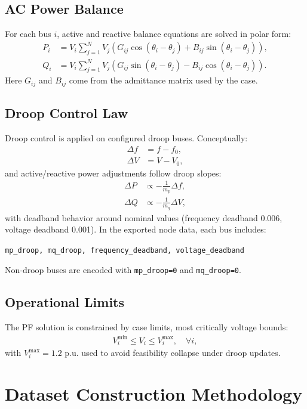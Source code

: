 ﻿\documentclass[11pt]{article}
\begin{document}
\subsection{AC Power Balance}
For each bus $i$, active and reactive balance equations are solved in polar form:
\begin{align}
P_i &= V_i \sum_{j=1}^{N} V_j \left(G_{ij}\cos(\theta_i-\theta_j) + B_{ij}\sin(\theta_i-\theta_j)\right), \\
Q_i &= V_i \sum_{j=1}^{N} V_j \left(G_{ij}\sin(\theta_i-\theta_j) - B_{ij}\cos(\theta_i-\theta_j)\right).
\end{align}
Here $G_{ij}$ and $B_{ij}$ come from the admittance matrix used by the case.

\subsection{Droop Control Law}
Droop control is applied on configured droop buses. Conceptually:
\begin{align}
\Delta f &= f - f_0, \\
\Delta V &= V - V_0,
\end{align}
and active/reactive power adjustments follow droop slopes:
\begin{align}
\Delta P &\propto -\frac{1}{m_p} \Delta f, \\
\Delta Q &\propto -\frac{1}{m_q} \Delta V,
\end{align}
with deadband behavior around nominal values (frequency deadband 0.006, voltage deadband 0.001). In the exported node data, each bus includes:
\begin{center}
\texttt{mp\_droop, mq\_droop, frequency\_deadband, voltage\_deadband}
\end{center}
Non-droop buses are encoded with \texttt{mp\_droop=0} and \texttt{mq\_droop=0}.

\subsection{Operational Limits}
The PF solution is constrained by case limits, most critically voltage bounds:
\begin{align}
V_i^{\min} \le V_i \le V_i^{\max}, \quad \forall i,
\end{align}
with $V_i^{\max}=1.2$ p.u. used to avoid feasibility collapse under droop updates.

\section{Dataset Construction Methodology}
\end{document}

